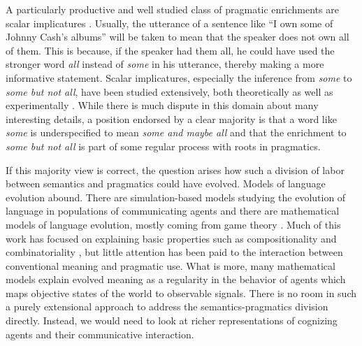 \documentclass[a4paper]{article}
\begin{document}
A particularly productive and well studied class of pragmatic enrichments are scalar
implicatures
\citep{horn:1984,Hirschberg1985:A-Theory-of-Sca,LevinsonPragmatics1983,Geurts2010:Quantity-Implic}. Usually,
the utterance of a sentence like ``I own some of Johnny Cash's albums'' will be taken to mean
that the speaker does not own all of them. This is because, if the speaker had them all, he
could have used the stronger word \emph{all} instead of \emph{some} in his utterance, 
thereby making a more informative statement. Scalar implicatures, especially the
inference from \emph{some} to \emph{some but not all}, have been studied extensively, both
theoretically
\citep[e.g.,][]{Sauerland2004:Scalar-Implicat,ChierchiaFox2008:The-Grammatical,Rooyvan-RooijJagerde-Jager2012:Explaining-Quan}
as well as experimentally
\citep[e.g.,][]{BottNoveck2004:Some-Utterances,huang+snedeker:2009,GrodnerKlein2010:Some-and-Possib,GoodmanStuhlmuller2013:Knowledge-and-I,DegenTanenhaus2012:Processing-Scal}. While
there is much dispute in this domain about many interesting details, a position endorsed by a
clear majority is that a word like \emph{some} is underspecified to mean \emph{some and maybe
  all} and that the enrichment to \emph{some but not all} is part of some regular 
process with roots in pragmatics.

If this majority view is correct, the question arises how such a division of labor between
semantics and pragmatics could have evolved. Models of language evolution abound. There are
simulation-based models studying the evolution of language in populations of communicating
agents
\citep{Hurford1989:Biological-Evol,Steels1995:A-Self-Organizi,LenaertsJansen2005:The-Evolutionar,SteelsBelpaeme2005:Coordinating-Pe,BaronchelliPuglisi2008:Cultural-route-,steels:2011,SpikeStadler2016:Minimal-Require}
and there are mathematical models of language evolution, mostly coming from game theory
\citep{lewis:1969,Warneryd1993:Cheap-Talk-Coor,BlumeKim1993:Evolutionary-St,nowak+krakauer:1999,Huttegger2007:Evolution-and-t,Skyrms2010:Signals}. Much of this work has focused on explaining basic properties such as compositionality and combinatoriality
\citep[e.g.,][]{Batali1998:Computational-S,nowak+krakauer:1999,nowak+etal:2000,KirbyHurford2002:The-Emergence-o,kirby:2002,SmithKirby2003:Iterated-Learni,Gong2007:Language-Evolut,kirby+etal:2015,verhoef+etal:2014,Franke2015:Proto-Syntax}, but
little attention has been paid to the interaction between conventional meaning and pragmatic
use. What is more, many mathematical models explain evolved meaning as a regularity in the
behavior of agents which maps objective states of the world to observable signals. There is no
room in such a purely extensional approach to address the semantics-pragmatics division
directly. Instead, we would need to look at richer representations of cognizing agents and their
communicative interaction.
\end{document}
